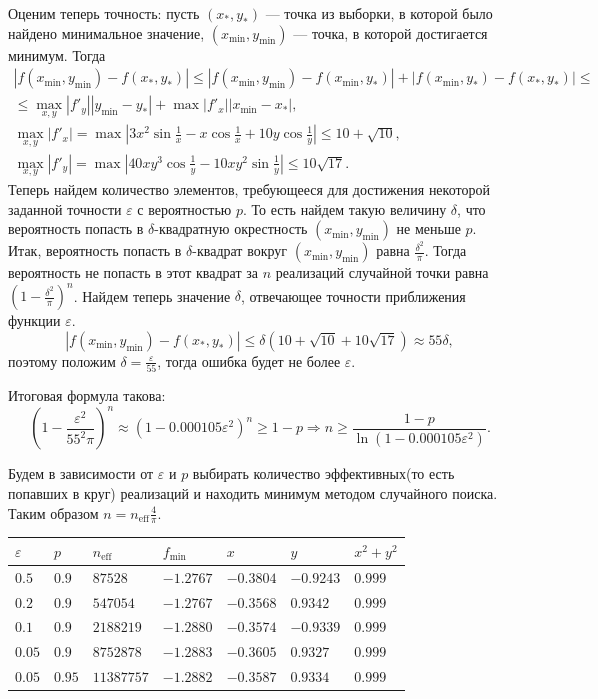 \documentclass[12pt, a4paper]{article}
\begin{document}
Оценим теперь точность: пусть $\left(x_*,y_*\right)$ --- точка из выборки, в которой было найдено минимальное значение, $(x_{\min},y_{\min})$ --- точка, в которой достигается минимум. Тогда
\begin{gather*} \left| f(x_{\min} , y_{\min}) - f(x_*,y_*) \right| 
	\leqslant \left| 
	f\left(x_{\min},y_{\min}\right) - f\left(x_{\min},y_*\right)\right| + \left| f\left(x_{\min},y_*\right) - f\left(x_*,y_*\right)  \right| 
	\leqslant \\ \leqslant
	\max\limits_{x,y} \left|f'_{y}\right|\left| y_{\min}-y_*\right| + \max \left|f'_x\right|\left| x_{\min}-x_* \right|, \\
	\max\limits_{x,y} \left|f'_x\right| = \max \left| 3x^2\sin\frac1{x} - x\cos\frac1{x}+10y\cos\frac1y \right|  \leqslant 10 + \sqrt{10}, \\
	\max\limits_{x,y}\left|f'_y\right| = \max \left| 40xy^3\cos\frac1y -10xy^2\sin\frac1y \right| \leqslant 10\sqrt{17}. 
\end{gather*}
Теперь найдем количество элементов, требующееся для достижения некоторой заданной точности $\varepsilon$ с вероятностью $p$. То есть найдем такую величину $\delta$, что вероятность попасть в $\delta$-квадратную окрестность $(x_{\min},y_{\min})$ не меньше $p$.
Итак, вероятность попасть в $\delta$-квадрат вокруг $(x_{\min},y_{\min})$ равна $\frac{\delta^2}{\pi}$. Тогда вероятность не попасть в этот квадрат за $n$ реализаций случайной точки равна $\left(1-\frac{\delta^2}{\pi}\right)^n$. Найдем теперь значение $\delta$, отвечающее точности приближения функции $\varepsilon$.
\[\left| f(x_{\min} , y_{\min}) - f(x_*,y_*) \right| \leqslant \delta\left( 10 + \sqrt{10} + 10\sqrt{17}\right) \approx 55\delta,  \]
поэтому положим $\delta = \frac \varepsilon{55}$, тогда ошибка будет не более $\varepsilon$.

Итоговая формула такова: \[ \left(1-\frac{\varepsilon^2}{55^2\pi}\right)^n \approx \left( 1-0.000105\varepsilon^2 \right) ^n \geqslant 1-p \Rightarrow  n \geqslant \frac{1-p}{\ln\left( 1-0.000105\varepsilon^2 \right) }.\] 

Будем в зависимости от $\varepsilon$ и $p$ выбирать количество эффективных(то есть попавших в круг) реализаций и находить минимум методом случайного поиска. Таким образом $n=n_{\text{eff} }\frac{4}{\pi}$.

\begin{tabular}{|l|l|l|l|l|l|l|}
\hline
$\varepsilon$ & $p$ & $n_{\text{eff} }$ & $f_{\min}$ &$x$& $y$ & $x^2+y^2$\\
\hline
$0.5$ & $0.9$ & $87528$ & $-1.2767$ & $-0.3804$ & $-0.9243$& $0.999$ \\
$0.2$ & $0.9$ & $547054$ & $-1.2767$ & $-0.3568$ & $0.9342$ & $0.999$\\
$0.1$ & $0.9$ & $2188219$ & $-1.2880$ & $-0.3574$ & $-0.9339$ & $0.999$\\
$0.05$ & $0.9$ & $8752878$ & $-1.2883$ & $-0.3605$ & $0.9327$ & $0.999$\\
$0.05$ & $0.95$ & $11387757$ & $-1.2882$ & $-0.3587$ & $0.9334$ & $0.999$\\
\hline
\end{tabular}
\end{document}

